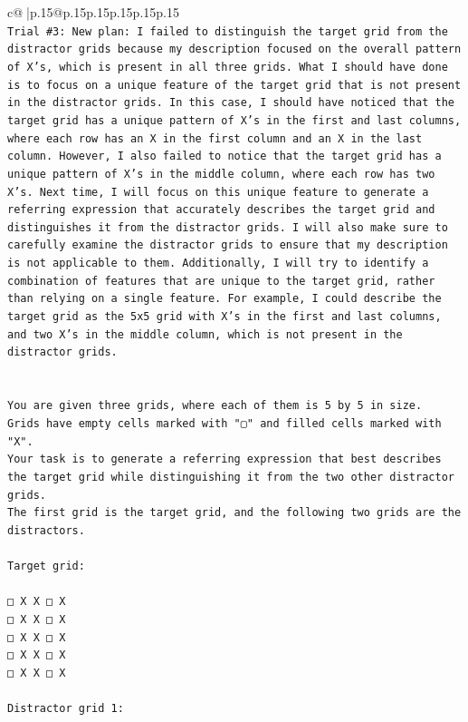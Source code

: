 \documentclass{article}
\begin{document}
{\begin{supertabular}{c@{$\;$}|p{.15\linewidth}@{}p{.15\linewidth}p{.15\linewidth}p{.15\linewidth}p{.15\linewidth}p{.15\linewidth}}
{{{\\ 
\texttt{Trial \#3: New plan: I failed to distinguish the target grid from the distractor grids because my description focused on the overall pattern of X's, which is present in all three grids. What I should have done is to focus on a unique feature of the target grid that is not present in the distractor grids. In this case, I should have noticed that the target grid has a unique pattern of X's in the first and last columns, where each row has an X in the first column and an X in the last column. However, I also failed to notice that the target grid has a unique pattern of X's in the middle column, where each row has two X's. Next time, I will focus on this unique feature to generate a referring expression that accurately describes the target grid and distinguishes it from the distractor grids. I will also make sure to carefully examine the distractor grids to ensure that my description is not applicable to them. Additionally, I will try to identify a combination of features that are unique to the target grid, rather than relying on a single feature. For example, I could describe the target grid as the 5x5 grid with X's in the first and last columns, and two X's in the middle column, which is not present in the distractor grids.} \\
\\ 
\\ 
\texttt{You are given three grids, where each of them is 5 by 5 in size.} \\
\texttt{Grids have empty cells marked with "▢" and filled cells marked with "X".} \\
\texttt{Your task is to generate a referring expression that best describes the target grid while distinguishing it from the two other distractor grids.} \\
\texttt{The first grid is the target grid, and the following two grids are the distractors.} \\
\\ 
\texttt{Target grid:} \\
\\ 
\texttt{□ X X □ X} \\
\texttt{□ X X □ X} \\
\texttt{□ X X □ X} \\
\texttt{□ X X □ X} \\
\texttt{□ X X □ X} \\
\\ 
\texttt{Distractor grid 1:} \\
\\ 
}}}
\end{supertabular}}
\end{document}
